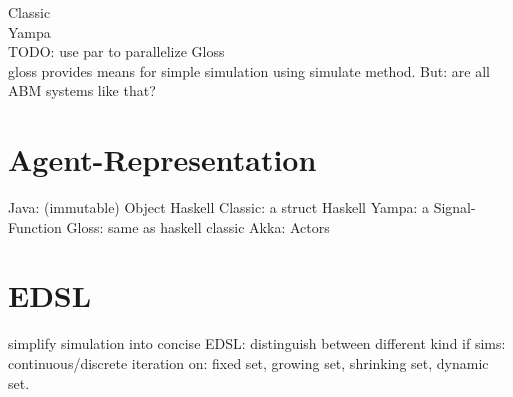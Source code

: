Classic \\
Yampa \\ TODO: use par to parallelize
Gloss \\
gloss provides means for simple simulation using simulate method. But: are all ABM systems like that?

\section{Agent-Representation}
Java: (immutable) Object
Haskell Classic: a struct
Haskell Yampa: a Signal-Function
Gloss: same as haskell classic
Akka: Actors

\section{EDSL}
simplify simulation into concise EDSL: distinguish between different kind if sims: continuous/discrete iteration on: fixed set, growing set, shrinking set, dynamic set. 